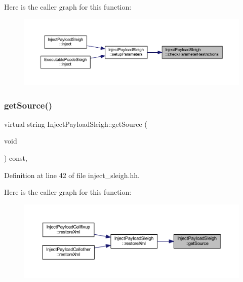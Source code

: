 Here is the caller graph for this function\+:
\nopagebreak
\begin{figure}[H]
\begin{center}
\leavevmode
\includegraphics[width=350pt]{class_inject_payload_sleigh_af694891d58e93134de26968640817371_icgraph}
\end{center}
\end{figure}
\mbox{\label{class_inject_payload_sleigh_a8de1f54277859a5f9b867abaa0387832}} 
\subsubsection{\texorpdfstring{getSource()}{getSource()}}
{\footnotesize\ttfamily virtual string Inject\+Payload\+Sleigh\+::get\+Source (\begin{DoxyParamCaption}\item[{void}]{ }\end{DoxyParamCaption}) const\hspace{0.3cm}{\ttfamily [inline]}, {\ttfamily [virtual]}}



Definition at line 42 of file inject\+\_\+sleigh.\+hh.

Here is the caller graph for this function\+:
\nopagebreak
\begin{figure}[H]
\begin{center}
\leavevmode
\includegraphics[width=350pt]{class_inject_payload_sleigh_a8de1f54277859a5f9b867abaa0387832_icgraph}
\end{center}
\end{figure}
\mbox{\label{class_inject_payload_sleigh_a54d60a04cf80a0fece97040b0dc8ed0d}} 
